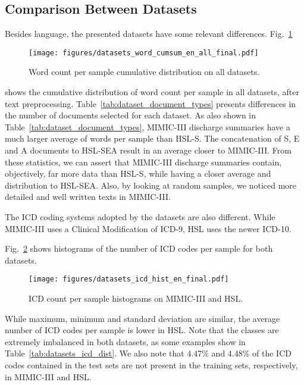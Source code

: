\documentclass[runningheads]{llncs}
\begin{document}
\subsection{Comparison Between Datasets}

Besides language, the presented datasets have some relevant differences. Fig.~\ref{fig:datasets_word_cumsum}
\begin{figure}[t]
	\centering
	\texttt{[image: figures/datasets\_word\_cumsum\_en\_all\_final.pdf]}
	\caption{Word count per sample cumulative distribution on all datasets.}
	\label{fig:datasets_word_cumsum}
\end{figure}
shows the cumulative distribution of word count per sample in all datasets, after text preprocessing. Table~\ref{tab:dataset_document_types} presents differences in the number of documents selected for each dataset. As also shown in Table~\ref{tab:dataset_document_types}, MIMIC-III discharge summaries have a much larger average of words per sample than HSL-S. The concatenation of S, E and A documents to HSL-SEA result in an average closer to MIMIC-III. From these statistics, we can assert that MIMIC-III discharge summaries contain, objectively, far more data than HSL-S, while having a closer average and distribution to HSL-SEA. Also, by looking at random samples, we noticed more detailed and well written texts in MIMIC-III. 

The ICD coding systems adopted by the datasets are also different. While MIMIC-III uses a Clinical Modification of ICD-9, HSL uses the newer ICD-10.

Fig.~\ref{fig:datasets_icd_hist} shows histograms of the number of ICD codes per sample for both datasets.
\begin{figure}[t]
	\centering
	\texttt{[image: figures/datasets\_icd\_hist\_en\_final.pdf]}
	\caption{ICD count per sample histograms on MIMIC-III and HSL.}
	\label{fig:datasets_icd_hist}
\end{figure}
While maximum, minimum and standard deviation are similar,
the average number of ICD codes per sample is lower in HSL. Note that the classes are extremely imbalanced in both datasets, as some examples show in Table~\ref{tab:datasets_icd_dist}. We also note that 4.47\% and 4.48\% of the ICD codes contained in the test sets are not present in the training sets, respectively, in MIMIC-III and HSL.
\end{document}
